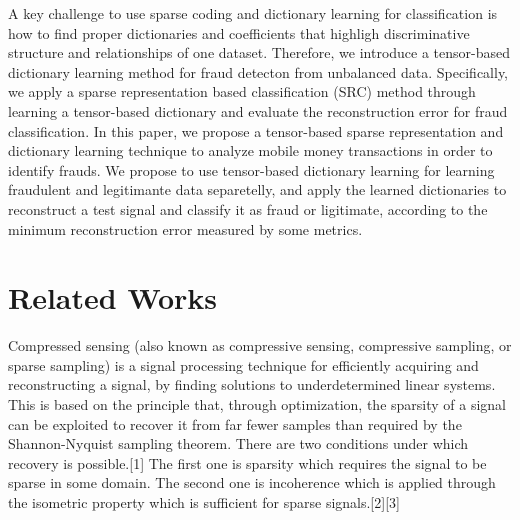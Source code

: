 A key challenge to use sparse coding and dictionary learning for classification is how to find proper dictionaries and coefficients that highligh discriminative structure and relationships of one dataset. Therefore, we introduce a tensor-based dictionary learning method for fraud detecton from unbalanced data. Specifically, we apply a sparse representation based classification (SRC) method through learning a tensor-based dictionary and evaluate the reconstruction error for fraud classification. In this paper, we propose a tensor-based sparse representation and dictionary learning technique to analyze mobile money transactions in order to identify frauds. We propose to use tensor-based dictionary learning for learning fraudulent and legitimante data separetelly, and apply the learned dictionaries to reconstruct a test signal and classify it as fraud or ligitimate, according to the minimum reconstruction error measured by some metrics.


\section{Related Works}

Compressed sensing (also known as compressive sensing, compressive sampling, or sparse sampling) is a signal processing technique for efficiently acquiring and reconstructing a signal, by finding solutions to underdetermined linear systems. This is based on the principle that, through optimization, the sparsity of a signal can be exploited to recover it from far fewer samples than required by the Shannon-Nyquist sampling theorem. There are two conditions under which recovery is possible.[1] The first one is sparsity which requires the signal to be sparse in some domain. The second one is incoherence which is applied through the isometric property which is sufficient for sparse signals.[2][3]


